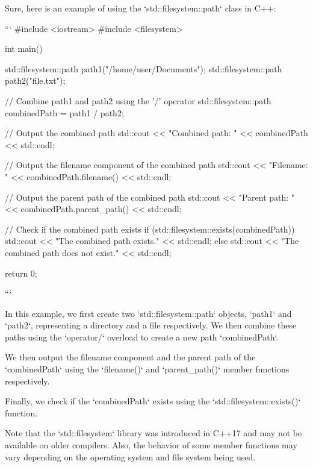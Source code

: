 Sure, here is an example of using the `std::filesystem::path` class in C++:

```
#include <iostream>
#include <filesystem>

int main() {
    std::filesystem::path path1("/home/user/Documents");
    std::filesystem::path path2("file.txt");

    // Combine path1 and path2 using the '/' operator
    std::filesystem::path combinedPath = path1 / path2;

    // Output the combined path
    std::cout << "Combined path: " << combinedPath << std::endl;

    // Output the filename component of the combined path
    std::cout << "Filename: " << combinedPath.filename() << std::endl;

    // Output the parent path of the combined path
    std::cout << "Parent path: " << combinedPath.parent_path() << std::endl;

    // Check if the combined path exists
    if (std::filesystem::exists(combinedPath)) {
        std::cout << "The combined path exists." << std::endl;
    }
    else {
        std::cout << "The combined path does not exist." << std::endl;
    }

    return 0;
}
```

In this example, we first create two `std::filesystem::path` objects, `path1` and `path2`, representing a directory and a file respectively. We then combine these paths using the `operator/` overload to create a new path `combinedPath`. 

We then output the filename component and the parent path of the `combinedPath` using the `filename()` and `parent_path()` member functions respectively.

Finally, we check if the `combinedPath` exists using the `std::filesystem::exists()` function.

Note that the `std::filesystem` library was introduced in C++17 and may not be available on older compilers. Also, the behavior of some member functions may vary depending on the operating system and file system being used.
